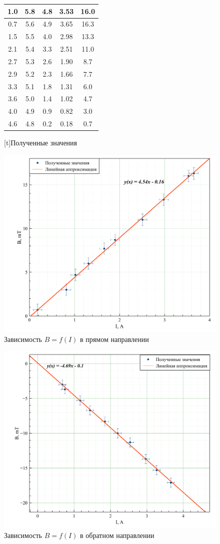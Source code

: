 \documentclass[a4paper, 12pt]{article}
\begin{document}
\begin{figure}[H]
{\begin{tabular}{|c|c|c|c|c|}
1.0 & 5.8 & 4.8 & 3.53 & 16.0 \\ \hline
0.7 & 5.6 & 4.9 & 3.65 & 16.3 \\ \hline
1.5 & 5.5 & 4.0 & 2.98 & 13.3 \\ \hline
2.1 & 5.4 & 3.3 & 2.51 & 11.0 \\ \hline
2.7 & 5.3 & 2.6 & 1.90 & 8.7  \\ \hline
2.9 & 5.2 & 2.3 & 1.66 & 7.7  \\ \hline
3.3 & 5.1 & 1.8 & 1.31 & 6.0  \\ \hline
3.6 & 5.0 & 1.4 & 1.02 & 4.7  \\ \hline
4.0 & 4.9 & 0.9 & 0.82 & 3.0  \\ \hline
4.6 & 4.8 & 0.2 & 0.18 & 0.7  \\ \hline
\end{tabular}
[t]{Полученные значения}%
}
\end{figure}

\begin{figure}[H]
\centering
	 \includegraphics[width = 0.7 \textwidth]{Graph1}
\caption{Зависимость $B = f(I)$ в прямом направлении}
\label {img:b(i)straight}
\end{figure}

\begin{figure}[H]
\centering
	 \includegraphics[width = 0.7 \textwidth]{Graph2}
\caption{Зависимость $B = f(I)$ в обратном направлении}
\label {img:b(i)otherwise}
\end{figure}
\end{document}
